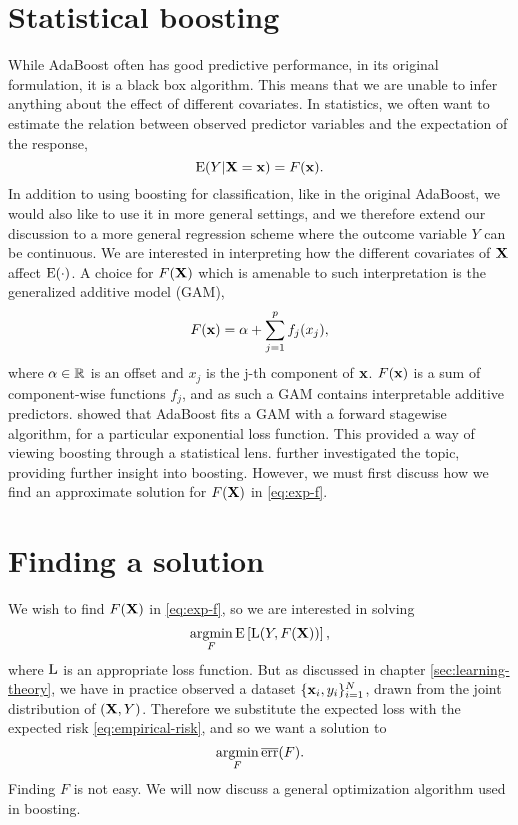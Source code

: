 \section{Statistical boosting}\label{sec:sboost}
While AdaBoost often has good predictive performance, in its original formulation, it is a black box algorithm. This means that we are unable to infer anything about the effect of different covariates. In statistics, we often want to estimate the relation between observed predictor variables and the expectation of the response,
\begin{equation}\label{eq:exp-f}
    \operatorname{E}(Y|\mathbf{X}=\mathbf{x})=F(\mathbf{x}).
\end{equation}
In addition to using boosting for classification, like in the original AdaBoost, we would also like to use it in more general settings, and we therefore extend our discussion to a more general regression scheme where the outcome variable $Y$ can be continuous. We are interested in interpreting how the different covariates of $\mathbf{X}$ affect $\operatorname{E}(\cdot)$. A choice for $F(\mathbf{X})$ which is amenable to such interpretation is the generalized additive model (GAM),
\begin{equation}\label{eq:gam}
    F(\mathbf{x})=\alpha+\sum_{j=1}^pf_j(x_j),
\end{equation}
where $\alpha\in\mathbb{R}$ is an offset and $x_j$ is the j-th component of $\mathbf{x}$. $F(\mathbf{x})$ is a sum of component-wise functions $f_j$, and as such a GAM contains interpretable additive predictors. \cite{friedman2000} showed that AdaBoost fits a GAM with a forward stagewise algorithm, for a particular exponential loss function. This provided a way of viewing boosting through a statistical lens. \cite{friedman2001} further investigated the topic, providing further insight into boosting. However, we must first discuss how we find an approximate solution for $F(\mathbf{X})$ in \eqref{eq:exp-f}.

\section{Finding a solution}
We wish to find $F(\mathbf{X})$ in \eqref{eq:exp-f}, so we are interested in solving
\begin{equation*}
    \operatorname*{argmin}_{F}\operatorname{E}\left[\operatorname{L}(Y,F(\mathbf{X}))\right],
\end{equation*}
where $\operatorname{L}$ is an appropriate loss function. But as discussed in chapter \ref{sec:learning-theory}, we have in practice observed a dataset $\{\mathbf{x}_i,y_i\}_{i=1}^N$, drawn from the joint distribution of $(\mathbf{X},Y)$. Therefore we substitute the expected loss with the expected risk \eqref{eq:empirical-risk}, and so we want a solution to
\begin{equation}\label{eq:argmin-risk}
    \operatorname*{argmin}_{F}\overline{\text{err}}(F).
\end{equation}
Finding $F$ is not easy. We will now discuss a general optimization algorithm used in boosting.

